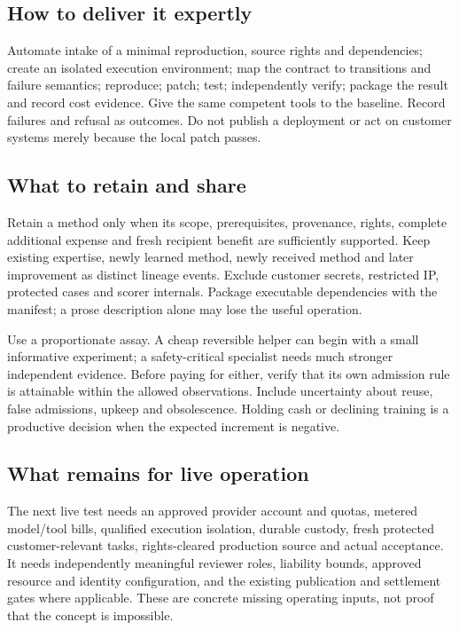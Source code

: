 \documentclass[11pt,letterpaper]{article}
\begin{document}
\subsection{How to deliver it expertly}
Automate intake of a minimal reproduction, source rights and dependencies; create an isolated execution environment; map the contract to transitions and failure semantics; reproduce; patch; test; independently verify; package the result and record cost evidence. Give the same competent tools to the baseline. Record failures and refusal as outcomes. Do not publish a deployment or act on customer systems merely because the local patch passes.

\subsection{What to retain and share}
Retain a method only when its scope, prerequisites, provenance, rights, complete additional expense and fresh recipient benefit are sufficiently supported. Keep existing expertise, newly learned method, newly received method and later improvement as distinct lineage events. Exclude customer secrets, restricted IP, protected cases and scorer internals. Package executable dependencies with the manifest; a prose description alone may lose the useful operation.

Use a proportionate assay. A cheap reversible helper can begin with a small informative experiment; a safety-critical specialist needs much stronger independent evidence. Before paying for either, verify that its own admission rule is attainable within the allowed observations. Include uncertainty about reuse, false admissions, upkeep and obsolescence. Holding cash or declining training is a productive decision when the expected increment is negative.

\subsection{What remains for live operation}
The next live test needs an approved provider account and quotas, metered model/tool bills, qualified execution isolation, durable custody, fresh protected customer-relevant tasks, rights-cleared production source and actual acceptance. It needs independently meaningful reviewer roles, liability bounds, approved resource and identity configuration, and the existing publication and settlement gates where applicable. These are concrete missing operating inputs, not proof that the concept is impossible.
\end{document}
